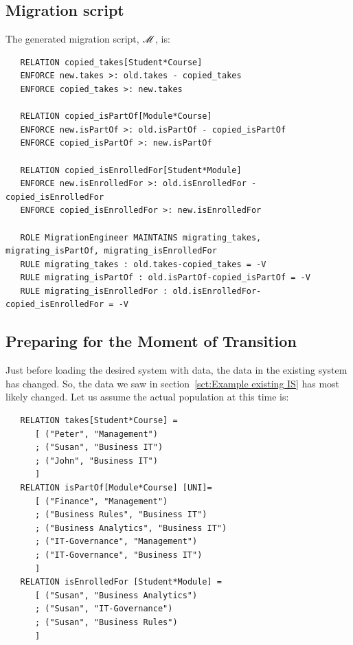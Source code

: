 \documentclass{elsarticle}
\begin{document}
\subsection{Migration script}
   The generated migration script, $\mathscr{M}$, is:
\begin{verbatim}
   RELATION copied_takes[Student*Course]
   ENFORCE new.takes >: old.takes - copied_takes
   ENFORCE copied_takes >: new.takes

   RELATION copied_isPartOf[Module*Course]
   ENFORCE new.isPartOf >: old.isPartOf - copied_isPartOf
   ENFORCE copied_isPartOf >: new.isPartOf

   RELATION copied_isEnrolledFor[Student*Module]
   ENFORCE new.isEnrolledFor >: old.isEnrolledFor - copied_isEnrolledFor
   ENFORCE copied_isEnrolledFor >: new.isEnrolledFor

   ROLE MigrationEngineer MAINTAINS migrating_takes, migrating_isPartOf, migrating_isEnrolledFor
   RULE migrating_takes : old.takes-copied_takes = -V
   RULE migrating_isPartOf : old.isPartOf-copied_isPartOf = -V
   RULE migrating_isEnrolledFor : old.isEnrolledFor-copied_isEnrolledFor = -V
\end{verbatim}

\subsection{Preparing for the Moment of Transition}
   Just before loading the desired system with data,
   the data in the existing system has changed.
   So, the data we saw in section~\ref{sct:Example existing IS} has most likely changed.
   Let us assume the actual population at this time is:
\begin{verbatim}
   RELATION takes[Student*Course] =
      [ ("Peter", "Management")
      ; ("Susan", "Business IT")
      ; ("John", "Business IT")
      ]
   RELATION isPartOf[Module*Course] [UNI]=
      [ ("Finance", "Management")
      ; ("Business Rules", "Business IT")
      ; ("Business Analytics", "Business IT")
      ; ("IT-Governance", "Management")
      ; ("IT-Governance", "Business IT")
      ]
   RELATION isEnrolledFor [Student*Module] =
      [ ("Susan", "Business Analytics")
      ; ("Susan", "IT-Governance")
      ; ("Susan", "Business Rules")
      ]
\end{verbatim}
\end{document}
